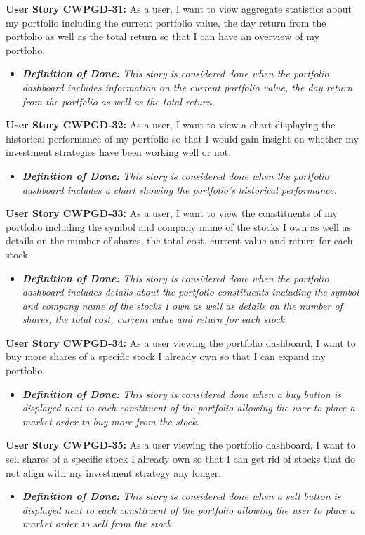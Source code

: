 \noindent \textbf{User Story CWPGD-31:} As a user, I want to view aggregate statistics about my portfolio including the current portfolio value, the day return from the portfolio as well as the total return so that I can have an overview of my portfolio.
\begin{itemize}
	\item \textit{\textbf{Definition of Done:} This story is considered done when the portfolio dashboard includes information on the current portfolio value, the day return from the portfolio as well as the total return.} 
\end{itemize}
\noindent \textbf{User Story CWPGD-32:} As a user, I want to view a chart displaying the historical performance of my portfolio so that I would gain insight on whether my investment strategies have been working well or not.
\begin{itemize}
	\item \textit{\textbf{Definition of Done:} This story is considered done when the portfolio dashboard includes a chart showing the portfolio’s historical performance.} 
\end{itemize}
\noindent \textbf{User Story CWPGD-33:} As a user, I want to view the constituents of my portfolio including the symbol and company name of the stocks I own as well as details on the number of shares, the total cost, current value and return for each stock.
\begin{itemize}
	\item \textit{\textbf{Definition of Done:} This story is considered done when the portfolio dashboard includes details about the portfolio constituents including the symbol and company name of the stocks I own as well as details on the number of shares, the total cost, current value and return for each stock.} 
\end{itemize}
\noindent \textbf{User Story CWPGD-34:} As a user viewing the portfolio dashboard, I want to buy more shares of a specific stock I already own so that I can expand my portfolio.
\begin{itemize}
	\item \textit{\textbf{Definition of Done:} This story is considered done when a buy button is displayed next to each constituent of the portfolio allowing the user to place a market order to buy more from the stock.} 
\end{itemize}
\noindent \textbf{User Story CWPGD-35:} As a user viewing the portfolio dashboard, I want to sell shares of a specific stock I already own so that I can get rid of stocks that do not align with my investment strategy any longer.
\begin{itemize}
	\item \textit{\textbf{Definition of Done:} This story is considered done when a sell button is displayed next to each constituent of the portfolio allowing the user to place a market order to sell from the stock.} 
\end{itemize}

